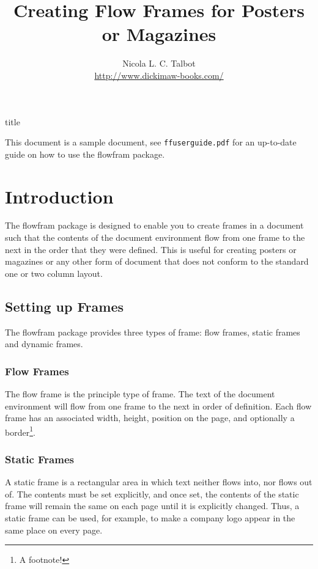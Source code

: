 \documentclass[a4paper]{article}
\newcommand{\sty}[1]{\textsf{#1}}
\newcommand{\env}[1]{\textsf{#1}}
\begin{document}
\begin{staticcontents*}{title}
\title{Creating Flow Frames for Posters or Magazines}
\author{Nicola L. C. Talbot\\[1cm]\url{http://www.dickimaw-books.com/}}
\date{}
\maketitle
\end{staticcontents*}

This document is a sample document, see \linebreak
\texttt{ffuserguide.pdf} for
an up-to-date guide on how to use the \sty{flowfram} package.

\section{Introduction}

The \sty{flowfram} package is designed to enable you to create
frames in a document such that the
contents of the \env{document} environment flow from one
frame to the next in the order that they were defined.
This is useful for creating posters
or magazines or any other form of document that does not
conform to the standard one or two column layout.

\subsection{Setting up Frames}

The \sty{flowfram} package provides three types of frame:
{flow frames}, {static
frames} and {dynamic frames}.

\subsubsection{Flow Frames}

The flow frame is the principle type of frame.
The text of the \env{document} environment will flow from
one frame to the next in order of definition. Each
flow frame has an associated width, height,
position on the page, and optionally a border\footnote{A
footnote!}.

\subsubsection{Static Frames}

A static frame is a rectangular area in which text neither
flows into, nor flows out of.  The contents must be set
explicitly, and once set, the contents of the static frame will
remain the same on each page until it is explicitly
changed.  Thus, a static frame can be used, for example, to make
a company logo appear in the same place on every page.
\end{document}
